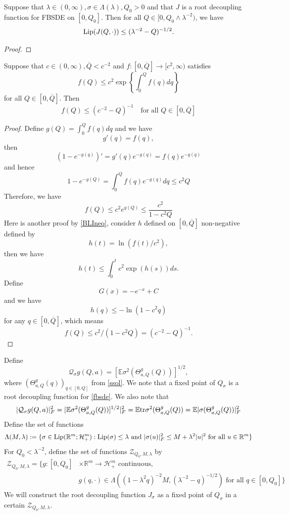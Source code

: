 \begin{proposition}
     Suppose that $\lambda \in (0,\infty), \sigma \in \Lambda(\lambda),Q_0 > 0$ and that $J$ is a root decoupling function for FBSDE on $[0,Q_0]$. Then for all $Q \in [0,Q_0 \wedge \lambda^{-2})$, we have
    \[\text{Lip}(J(Q,\cdot)) \leq (\lambda^{-2} - Q)^{-1/2}.\label{dplip}\]
\end{proposition}
\begin{proof}
    
\end{proof}

\begin{lemma}
    Suppose that $c\in (0,\infty), \overline{Q}<c^{-2}$ and $f:[0,\overline{Q}] \to [c^2,\infty)$ satisfies
    \[f(Q) \leq c^2\exp\left\{\int_0^Q f(q)dq\right\}\]
    for all $Q \in [0,\overline{Q}]$. Then
    \[
    f(Q) \leq (c^{-2}-Q)^{-1}\quad\text{for all }Q\in[0,\overline{Q}]
    \]
\end{lemma}
\begin{proof}
    Define $g(Q) = \int_0^Q f(q)dq$ and we have
    \[
    g'(q) = f(q),
    \]
    then
    \[
    (1 - e^{-g(q)})' = g'(q)e^{-g(q)} = f(q)e^{-g(q)} 
    \]
    and hence
    \[
    1 - e^{-g(Q)} = \int_0^Q f(q)e^{-g(q)}dq \leq c^2Q 
    \]
    Therefore, we have
    \[
    f(Q) \leq c^2e^{g(Q)} \leq \dfrac{c^2}{1-c^2Q}
    \]
    Here is another proof by \eqref{BLIneq}, consider $h$ defined on $[0,\overline{Q}]$ non-negative defined by
    \[
    h(t) = \ln(f(t)/c^2),
    \]
    then we have
    \[
    h(t) \leq \int_0^t c^2\exp(h(s))ds.
    \]
    Define
    \[
    G(x) = -e^{-x} +C
    \]
    and we have
    \[
    h(q) \leq -\ln(1-c^2q)
    \]
    for any $q \in[0,\overline{Q}]$, which means
    \[
    f(Q) \leq c^2/(1-c^2Q) = (c^{-2}-Q)^{-1}.
    \]
\end{proof}

\begin{definition}\par
    Define \[\mathcal{Q}_{\sigma}g(Q,a) = [\mathbb{E}\sigma^2(\Theta^g_{a,Q}(Q))]^{1/2},\] where $(\Theta^g_{a,Q}(q))_{q\in[0,Q]}$ from \eqref{ssol}. We note that a fixed point of $Q_{\sigma}$ is a root decoupling function for \eqref{fbsde}. We  also note that
    \[|\mathcal{Q}_{\sigma}g(Q,a)|_F^2 = |\mathbb{E}\sigma^2(\Theta^g_{a,Q}(Q))]^{1/2}|^2_F = \mathbb{E}\text{tr}\sigma^2(\Theta^g_{a,Q}(Q)) = \mathbb{E}|\sigma(\Theta^g_{a,Q}(Q))|^2_F
    \]
    Define the set of functions
    \[
    \Lambda(M,\lambda):=\{\sigma\in \text{Lip}(\mathbb{R}^m;\mathcal{H}_+^m):\text{Lip}(\sigma) \leq \lambda\text{ and }|\sigma(u)|_F^2 \leq M + \lambda^2|u|^2\text{ for all }u\in\mathbb{R}^m\}
    \] For $Q_0  < \lambda^{-2}$, define the set of functions $\mathcal{Z}_{Q_0,M,\lambda}$ by
    \[
    \begin{aligned}
        \mathcal{Z}_{Q_0,M,\lambda} = \big\{g:[0,Q_0]&\times \mathbb{R}^m\to\mathcal{H}_+^m\text{ continuous}, \\
        & g(q,\cdot) \in \Lambda((1-\lambda^2 q)^{-2}M,(\lambda^{-2}-q)^{-1/2})\text{ for all }q\in [0,Q_0]\big\}
    \end{aligned}
    \]
We will construct the root decoupling function $J_{\sigma}$ as a fixed point of $Q_{\sigma}$  in a certain $\mathcal{Z}_{Q_0,M,\lambda}$.
\end{definition}

